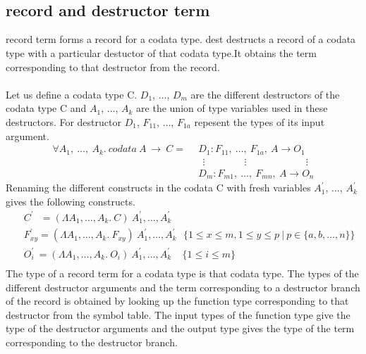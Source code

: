 \documentclass[11pt]{article}
\begin{document}
~~\\~~\\
\subsection {record and destructor term}
{\sf record } term forms a record for a codata type. {\sf dest} destructs a record of a codata type with a particular destuctor of that codata type.It obtains the term corresponding to that destructor from the record.
~~\\~~\\
Let us define a codata type C. $D_1$, $\ldots$, $D_m$ are the different destructors of the codata type C and $A_1$, $\ldots$, $A_k$ are the union of type variables used in these destructors. For destructor $D_1$, $F_{11}$, $\ldots$, $F_{1a}$ repesent the types of its input argument.
\begin{align*} 
\forall A_1,~ \ldots,~A_k.~codata~ A ~\to~ C =
 & ~~ D_1 : F_{11},~ \ldots, ~ F_{1a},~A \to O_1 \\
 & ~~~~ \vdots \qquad\qquad \vdots \qquad\qquad\qquad \vdots \\ 
 & ~~ D_m : F_{m1} ,~ \ldots, ~ F_{mn},~A \to O_n
\end{align*}
Renaming the different constructs in the codata C with fresh variables $A_1^{\prime}$, $\ldots$, $A_k^{\prime}$ gives the following constructs. 
\begin{align*}
 & ~~ C^{\prime} ~~~ = (\Lambda A_1,\ldots,A_k.~ C)~A_1^{\prime},\ldots,A_k^{\prime}\\ 
 & ~~ F_{xy}^\prime = (\Lambda A_1,\ldots,A_k.~F_{xy})~A_1^{\prime},\ldots,A_k^{\prime} 
 ~~~  \{1 \leq x \leq m,1 \leq y \leq p ~|~ p \in \{a,b,\ldots,n\} \} \\
 & ~~ O_{i}^\prime ~= (\Lambda A_1,\ldots,A_k.~ O_i)~A_1^{\prime},\ldots,A_k^{\prime} 
  ~~~~~ \{ 1 \leq i \leq m \} \\
 \end{align*}
The type of a {\sf record} term for a codata type is that codata type. The types of the different destructor arguments and the term corresponding to a destructor branch of the record is obtained by looking up the function type corresponding to that destructor from the symbol table. The input types of the function type give the type of the destructor arguments and the output type gives the type of the term corresponding to the destructor branch.
\end{document}
